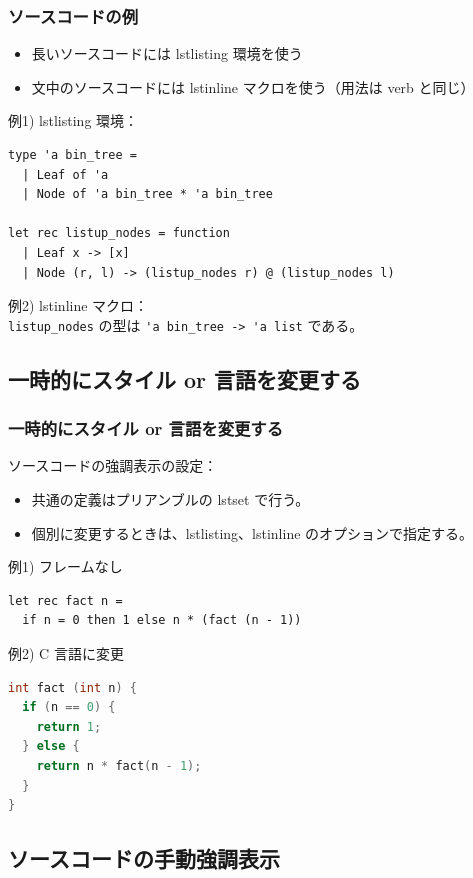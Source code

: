 \documentclass[dvipdfmx,cjk,xcolor=dvipsnames,envcountsect,notheorems,12pt]{beamer}
\theoremstyle{definition}
\begin{document}
\begin{frame}[fragile]%
  \frametitle{ソースコードの例}
  \begin{itemize}
  \item 長いソースコードには lstlisting 環境を使う
  \item 文中のソースコードには lstinline マクロを使う（用法は verb と同じ）
  \end{itemize}
  \vfill
  例1) lstlisting 環境：
\begin{lstlisting}
type 'a bin_tree =
  | Leaf of 'a
  | Node of 'a bin_tree * 'a bin_tree

let rec listup_nodes = function
  | Leaf x -> [x]
  | Node (r, l) -> (listup_nodes r) @ (listup_nodes l)
\end{lstlisting}
  \vfill
  例2) lstinline マクロ：\\
  \lstinline|listup_nodes| の型は \lstinline|'a bin_tree -> 'a list| である。
\end{frame}

\subsection{一時的にスタイル or 言語を変更する}

\begin{frame}[fragile]%
  \frametitle{一時的にスタイル or 言語を変更する}
  ソースコードの強調表示の設定：
  \begin{itemize}
  \item 共通の定義はプリアンブルの lstset で行う。
  \item 個別に変更するときは、lstlisting、lstinline のオプションで指定する。
  \end{itemize}
  \vfill
  例1) フレームなし
\begin{lstlisting}[frame=none]
let rec fact n =
  if n = 0 then 1 else n * (fact (n - 1))
\end{lstlisting}
  \vfill
  例2) C 言語に変更
\begin{lstlisting}[language=C]
int fact (int n) {
  if (n == 0) {
    return 1;
  } else {
    return n * fact(n - 1);
  }
}
\end{lstlisting}
\end{frame}

\subsection{ソースコードの手動強調表示}
\end{document}
